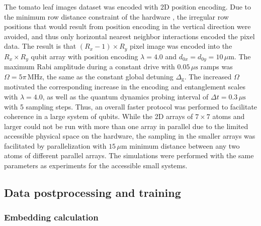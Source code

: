 \documentclass[english,floatfix,twocolumn,showpacs, aps, prx, reprint, superscriptaddress, longbibliography]{revtex4-2}
\begin{document}
The tomato leaf images dataset was encoded with 2D position encoding. Due to the minimum row distance constraint of the hardware \cite{Wurtz2023}, the irregular row positions that would result from position encoding in the vertical direction were avoided, and thus only horizontal nearest neighbor interactions encoded the pixel data. The result is that $(R_x-1)\times R_y$ pixel image was encoded into the $R_x \times R_y$ qubit array with position encoding $\lambda =4.0$ and $d_{0x}=d_{0y}=10 \, \mu \mathrm{m}$. The maximum Rabi amplitude during a constant drive with $0.05 \, \mu \mathrm{s}$ ramps was $\Omega=5\pi \, \mathrm{MHz}$, the same as the constant global detuning $\Delta_{\mathrm{g}}$. The increased $\Omega$ motivated the corresponding increase in the encoding and entanglement scales with $\lambda=4.0$, as well as the quantum dynamics probing interval of $\Delta t=0.3 \, \mu \mathrm{s}$ with 5 sampling steps. Thus, an overall faster protocol was performed to facilitate coherence in a large system of qubits. While the 2D arrays of $7 \times 7$ atoms and larger could not be run with more than one array in parallel due to the limited accessible physical space on the hardware, the sampling in the smaller arrays was facilitated by parallelization with $15 \, \mu \mathrm{m}$ minimum distance between any two atoms of different parallel arrays. The simulations were performed with the same parameters as experiments for the accessible small systems.

\subsection{Data postprocessing and training}

\subsubsection{Embedding calculation}
\end{document}
